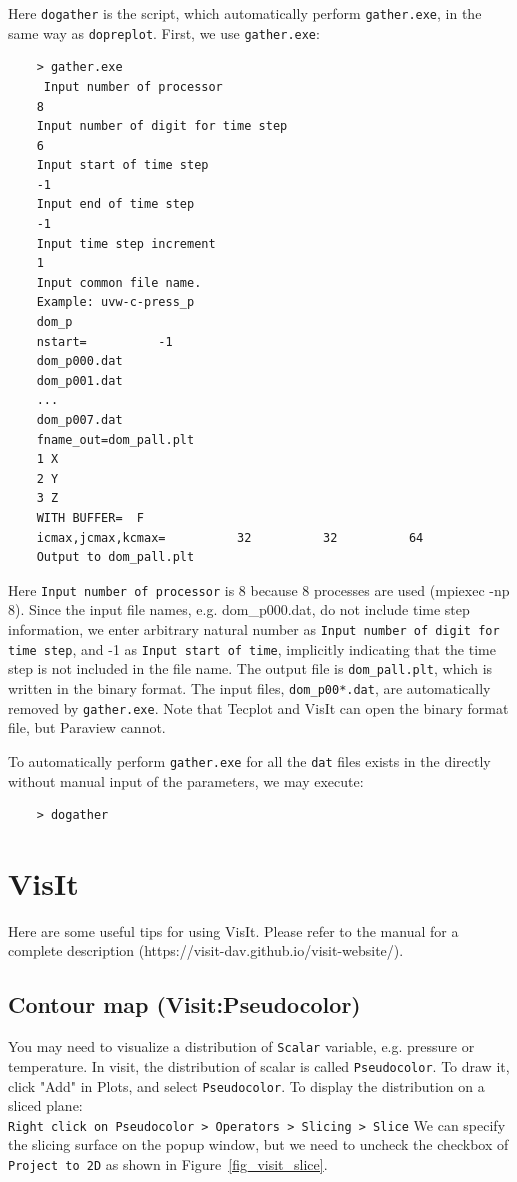 Here {\tt dogather} is the script, which automatically perform {\tt gather.exe}, in the same way as {\tt dopreplot}. First, we use {\tt gather.exe}:
\begin{verbatim}
	> gather.exe
	 Input number of processor
	8
	Input number of digit for time step
	6
	Input start of time step
	-1
	Input end of time step
	-1
	Input time step increment
	1
	Input common file name.
	Example: uvw-c-press_p
	dom_p
	nstart=          -1
	dom_p000.dat
	dom_p001.dat
	...
	dom_p007.dat
	fname_out=dom_pall.plt
	1 X
	2 Y
	3 Z
	WITH BUFFER=  F
	icmax,jcmax,kcmax=          32          32          64
	Output to dom_pall.plt
\end{verbatim} 
Here {\tt Input number of processor} is 8 because 8 processes are used (mpiexec -np 8). Since the input file names, e.g. dom\_p000.dat, do not include time step information, we enter arbitrary natural number as {\tt Input number of digit for time step}, and -1 as {\tt Input start of time}, implicitly indicating that the time step is not included in the file name. The output file is {\tt dom\_pall.plt}, which is written in the binary format. The input files, {\tt dom\_p00*.dat}, are automatically removed by {\tt gather.exe}. Note that Tecplot and VisIt can open the binary format file, but Paraview cannot.

To automatically perform {\tt gather.exe} for all the {\tt *dat} files exists in the directly without manual input of the parameters, we may execute:
\begin{verbatim}
	> dogather
\end{verbatim} 
 
\section{VisIt}
\label{sec_visit}
Here are some useful tips for using VisIt. Please refer to the manual for a complete description (https://visit-dav.github.io/visit-website/).

\subsection{Contour map (Visit:Pseudocolor)}
You may need to visualize a distribution of {\tt Scalar} variable, e.g. pressure or temperature. In visit, the distribution of scalar is called {\tt Pseudocolor}. To draw it, click "Add" in Plots, and select {\tt Pseudocolor}. To display the distribution on a sliced plane:\\
{\tt Right click on Pseudocolor > Operators > Slicing > Slice}
We can specify the slicing surface on the popup window, but we need to uncheck the checkbox of {\tt Project to 2D} as shown in Figure~\ref{fig_visit_slice}.

